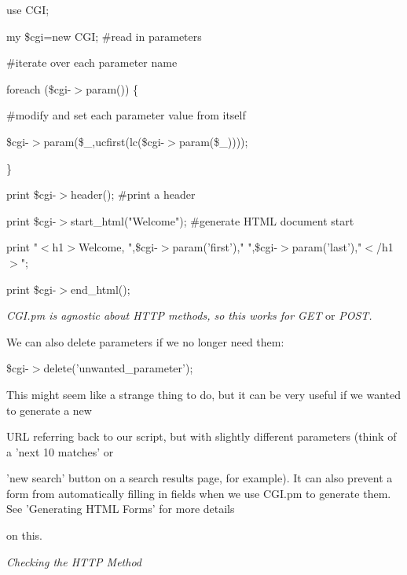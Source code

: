\documentclass[a4paper,11pt]{book}
\begin{document}
\noindent 

\noindent use CGI;

\noindent 

\noindent my \$cgi=new CGI; \#read in parameters

\noindent 

\noindent \#iterate over each parameter name

\noindent foreach (\$cgi-$>$param()) \{

\noindent \#modify and set each parameter value from itself

\noindent \$cgi-$>$param(\$\_,ucfirst(lc(\$cgi-$>$param(\$\_))));

\noindent \}

\noindent 

\noindent print \$cgi-$>$header(); \#print a header

\noindent print \$cgi-$>$start\_html("Welcome"); \#generate HTML document start

\noindent print "$<$h1$>$Welcome, ",\$cgi-$>$param('first')," ",\$cgi-$>$param('last'),"$<$/h1$>$";

\noindent print \$cgi-$>$end\_html();

\noindent 

\noindent 

\noindent \textit{CGI.pm is agnostic about HTTP methods, so this works for GET }or \textit{POST.}

\noindent 

\noindent 

\noindent We can also delete parameters if we no longer need them:

\noindent 

\noindent \$cgi-$>$delete('unwanted\_parameter');

\noindent 

\noindent This might seem like a strange thing to do, but it can be very useful if we wanted to generate a new

\noindent URL referring back to our script, but with slightly different parameters (think of a 'next 10 matches' or

\noindent 'new search' button on a search results page, for example). It can also prevent a form from automatically filling in fields when we use CGI.pm to generate them. See 'Generating HTML Forms' for more details

\noindent on this.

\noindent 

\noindent \textit{Checking the HTTP Method}
\end{document}
